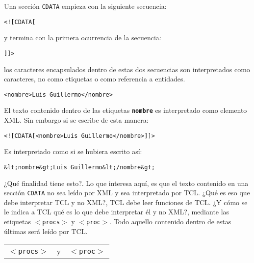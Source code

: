 \documentclass[10pt, a4paper, twocolumn]{article} %
\begin{document}
Una sección \texttt{CDATA} empieza con la siguiente secuencia:

\begin{flushleft}
\begin{verbatim}
<![CDATA[
\end{verbatim}
\end{flushleft}

y termina con la primera ocurrencia de la secuencia:

\begin{flushleft}
\begin{verbatim}
]]>
\end{verbatim}
\end{flushleft}

los caracteres encapsulados dentro de estas dos secuencias son interpretados como caracteres, no como etiquetas o como referencia a entidades.

\lstset{language=XML} 
\begin{lstlisting}
<nombre>Luis Guillermo</nombre>
\end{lstlisting}

El texto contenido dentro de las etiquetas \textbf{\texttt{nombre}} es interpretado como elemento XML. Sin embargo si se escribe de esta manera:


\begin{verbatim}
<![CDATA[<nombre>Luis Guillermo</nombre>]]>
\end{verbatim}

Es interpretado como si se hubiera escrito así:

\begin{verbatim}
&lt;nombre&gt;Luis Guillermo&lt;/nombre&gt;
\end{verbatim}

¿Qué finalidad tiene esto?. Lo que interesa aquí, es que el texto contenido en una sección \texttt{CDATA} no sea leído por XML y sea interpretado por TCL. ¿Qué es eso que debe interpretar TCL y no XML?, TCL debe leer funciones de TCL. ¿Y cómo se le indica a TCL qué es lo que debe interpretar él y no XML?, mediante las etiquetas \texttt{$<$procs$>$} y \texttt{$<$proc$>$}. Todo aquello contenido dentro de estas últimas será leído por TCL.

\vspace{0.20cm}
\begin{center}
	\begin{tabular}{rcl}
		\texttt{$<$procs$>$} &y&\texttt{$<$proc$>$}\\
	\end{tabular}
\end{center}
\vspace{0.20cm}
\end{document}
